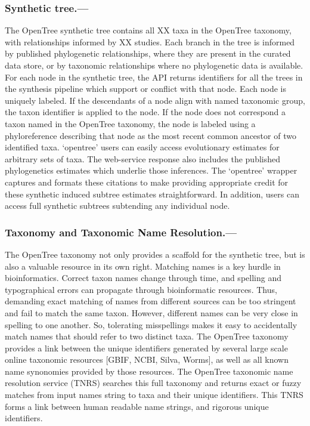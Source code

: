 \documentclass[oupdraft]{sysbio_sse}
\begin{document}
\subsubsection{Synthetic tree.---} The OpenTree synthetic tree contains all XX taxa in the OpenTree taxonomy, with relationships informed by XX studies.
Each branch in the tree is informed by published phylogenetic relationships, where they are present in the curated data store, or by taxonomic relationships where no phylogenetic data is available.
For each node in the synthetic tree, the API returns identifiers for
all the trees in the synthesis pipeline which support or conflict with that node.
Each node is uniquely labeled.
If the descendants of a node align with named taxonomic group, the taxon identifier is applied to the node.
If the node does not correspond a taxon named in the OpenTree taxonomy, the node is labeled using a phyloreference \cite{parr_et_al_2012} describing that node as the most recent common ancestor of two identified taxa.
`opentree' users can easily access evolutionary estimates for arbitrary sets of taxa.
The web-service response also includes the published phylogenetics estimates which underlie those inferences.
The `opentree' wrapper captures and formats these citations to make providing appropriate credit for these synthetic induced subtree estimates straightforward.
In addition, users can access full synthetic subtrees subtending any individual node.


\subsubsection{Taxonomy and Taxonomic Name Resolution.---} The OpenTree taxonomy not only provides a scaffold for the synthetic tree, but is also a valuable resource in its own right.
Matching names is a key hurdle in bioinformatics.
Correct taxon names change through time, and spelling and typographical errors can propagate through bioinformatic resources.
Thus, demanding exact matching of names from different sources can be too stringent and fail to match the same taxon.
However, different names can be very close in spelling to one another.
So, tolerating misspellings makes it easy to accidentally match names that should refer to two distinct taxa.
The OpenTree taxonomy \citep{rees_automated_2017, opentreeoflife_open_2019-1} provides a link between the unique identifiers generated by several large scale online taxonomic resources [GBIF, NCBI, Silva, Worms], as well as all known name synonomies provided by those resources.
The OpenTree taxonomic name resolution service (TNRS) searches this full taxonomy and returns exact or fuzzy matches from input names string to taxa and their unique identifiers.
This TNRS forms a link between human readable name strings, and rigorous unique identifiers.
\end{document}
